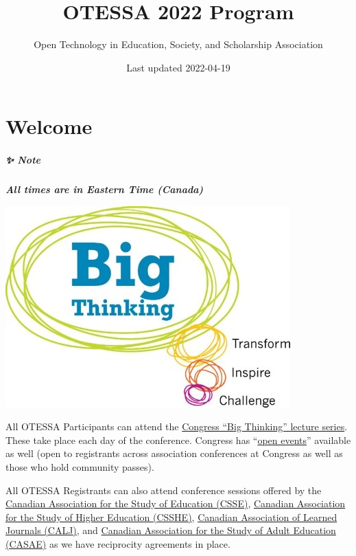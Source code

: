 \documentclass[
]{book}
\title{OTESSA 2022 Program}
\author{Open Technology in Education, Society, and Scholarship Association}
\date{Last updated 2022-04-19}
\begin{document}
\maketitle

{
\setcounter{tocdepth}{1}
\tableofcontents
}
\hypertarget{welcome}{%
\chapter*{Welcome}\label{welcome}}

\begin{protip}
\hypertarget{note}{%
\paragraph*{✨ Note}\label{note}}

\textbf{\emph{All times are in Eastern Time (Canada)}}
\end{protip}

\includegraphics{assets/media/image2.jpeg}

All OTESSA Participants can attend the \href{https://www.federationhss.ca/en/congress/congress-2022/open-programming}{Congress ``Big Thinking'' lecture series}. These take place each day of the conference. Congress has ``\href{https://www.federationhss.ca/en/congress/congress-2022/calendar-open-events}{open events}'' available as well (open to registrants across association conferences at Congress as well as those who hold community passes).

All OTESSA Registrants can also attend conference sessions offered by the \href{https://csse-scee.ca/}{Canadian Association for the Study of Education (CSSE)}, \href{https://csshe-scees.ca/}{Canadian Association for the Study of Higher Education (CSSHE)}, \href{https://www.calj-acrs.ca/}{Canadian Association of Learned Journals (CALJ)}, and \href{https://www.casae-aceea.ca/}{Canadian Association for the Study of Adult Education (CASAE)} as we have reciprocity agreements in place.
\end{document}
